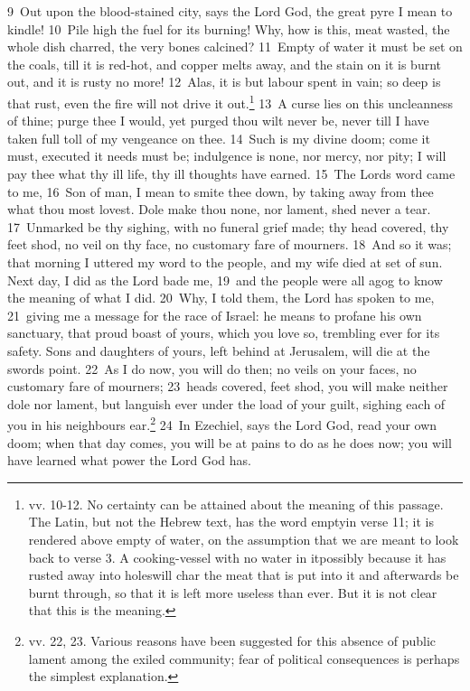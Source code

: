 \documentclass[10pt]{book} %
\begin{document}
\textcolor{benred8}{9}~Out upon the blood-stained city, says the Lord God, the great pyre I mean to kindle! \textcolor{benred8}{10}~Pile high the fuel for its burning! Why, how is this, meat wasted, the whole dish charred, the very bones calcined? \textcolor{benred8}{11}~Empty of water it must be set on the coals, till it is red-hot, and copper melts away, and the stain on it is burnt out, and it is rusty no more! \textcolor{benred8}{12}~Alas, it is but labour spent in vain; so deep is that rust, even the fire will not drive it out.\footnote[4]{vv. 10-12. No certainty can be attained about the meaning of this passage. The Latin, but not the Hebrew text, has the word \textasciigrave empty\textquotesingle  in verse 11; it is rendered above \textasciigrave empty of water\textquotesingle , on the assumption that we are meant to look back to verse 3. A cooking-vessel with no water in it\textemdash possibly because it has rusted away into holes\textemdash will char the meat that is put into it and afterwards be burnt through, so that it is left more useless than ever. But it is not clear that this is the meaning.} \textcolor{benred8}{13}~A curse lies on this uncleanness of thine; purge thee I would, yet purged thou wilt never be, never till I have taken full toll of my vengeance on thee. \textcolor{benred8}{14}~Such is my divine doom; come it must, executed it needs must be; indulgence is none, nor mercy, nor pity; I will pay thee what thy ill life, thy ill thoughts have earned.
\textcolor{benred8}{15}~The Lord\textquotesingle s word came to me, \textcolor{benred8}{16}~Son of man, I mean to smite thee down, by taking away from thee what thou most lovest. Dole make thou none, nor lament, shed never a tear. \textcolor{benred8}{17}~Unmarked be thy sighing, with no funeral grief made; thy head covered, thy feet shod, no veil on thy face, no customary fare of mourners. \textcolor{benred8}{18}~And so it was; that morning I uttered my word to the people, and my wife died at set of sun. Next day, I did as the Lord bade me, \textcolor{benred8}{19}~and the people were all agog to know the meaning of what I did. \textcolor{benred8}{20}~Why, I told them, the Lord has spoken to me, \textcolor{benred8}{21}~giving me a message for the race of Israel: he means to profane his own sanctuary, that proud boast of yours, which you love so, trembling ever for its safety. Sons and daughters of yours, left behind at Jerusalem, will die at the sword\textquotesingle s point. \textcolor{benred8}{22}~As I do now, you will do then; no veils on your faces, no customary fare of mourners; \textcolor{benred8}{23}~heads covered, feet shod, you will make neither dole nor lament, but languish ever under the load of your guilt, sighing each of you in his neighbour\textquotesingle s ear.\footnote[5]{vv. 22, 23. Various reasons have been suggested for this absence of public lament among the exiled community; fear of political consequences is perhaps the simplest explanation.} \textcolor{benred8}{24}~In Ezechiel, says the Lord God, read your own doom; when that day comes, you will be at pains to do as he does now; you will have learned what power the Lord God has.
\end{document}
